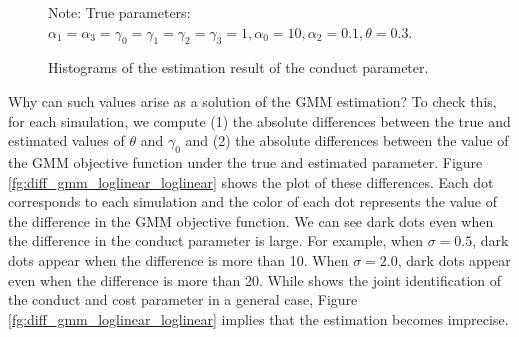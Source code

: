 \documentclass[11pt, a4paper]{article}
\begin{document}
\begin{figure}[!htbp]
  \begin{center}
  \caption{Histograms of the estimation result of the conduct parameter.}
  \label{fg:histogram_loglinear_loglinear_no_constraint} 
  \end{center}
  \footnotesize
  Note: True parameters: $\alpha_1 = \alpha_3 = \gamma_0 = \gamma_1 = \gamma_2  = \gamma_3 = 1, \alpha_0 = 10, \alpha_2 = 0.1,  \theta = 0.3.$
\end{figure}

Why can such values arise as a solution of the GMM estimation?
To check this, for each simulation, we compute (1) the absolute differences between the true and estimated values of $\theta$ and $\gamma_0$ and (2) the absolute differences between the value of the GMM objective function under the true and estimated parameter.
Figure \ref{fg:diff_gmm_loglinear_loglinear} shows the plot of these differences. 
Each dot corresponds to each simulation and the color of each dot represents the value of the difference in the GMM objective function. 
We can see dark dots even when the difference in the conduct parameter is large.
For example, when $\sigma = 0.5$, dark dots appear when the difference is more than 10.
When $\sigma = 2.0$, dark dots appear even when the difference is more than 20.
While \citet{lau1982identifying} shows the joint identification of the conduct and cost parameter in a general case, Figure \ref{fg:diff_gmm_loglinear_loglinear} implies that the estimation becomes imprecise.
\end{document}

